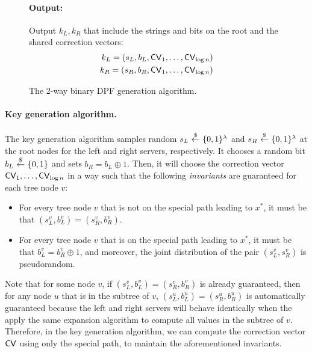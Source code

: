 \begin{figure}[p]
\begin{minipage}{\textwidth}
\begin{mdframed}
            \paragraph{Output:} Output $k_L, k_R$ that include the strings and bits on the root and the shared correction vectors:
            \begin{align*}
                k_L=(s_L, b_L, {\sf CV}_1,\dots,{\sf CV}_{\log n}) \\
                k_R=(s_R, b_R, {\sf CV}_1,\dots,{\sf CV}_{\log n})
            \end{align*}
            
        \end{mdframed}
    \end{minipage}
    \caption{The 2-way binary DPF generation algorithm.\label{fig:DPF}}
\label{fig:gen}
\end{figure}


\paragraph{Key generation algorithm.}
The key generation algorithm samples  
random $s_L ~{\overset{\$}{\leftarrow}}~ \{0, 1\}^\lambda$ and $s_R ~{\overset{\$}{\leftarrow}}~ \{0, 1\}^\lambda$ 
at the root nodes for the left and right servers, respectively.
It chooses a random bit $b_L ~{\overset{\$}{\leftarrow}}~\{0, 1\}$ 
and sets $b_R = b_L \oplus 1$.
Then, it will choose the correction vector ${\sf CV}_1, \ldots, {\sf CV}_{\log n}$
in a way such that 
the following {\it invariants} are guaranteed for each
tree node $v$:

\begin{itemize}[leftmargin=7mm]
\item 
For every tree node $v$
that is not on the special path leading to $x^*$, 
it must be that $(s_L^v, b_L^v) = (s_R^v, b_R^v)$.
\item 
For every tree node $v$
that is on the special path leading to $x^*$, 
it must be that $b_L^v = b_R^v \oplus 1$,
and moreover, the joint distribution of the pair $(s_L^v, s_R^v)$ 
is pseudorandom.
\end{itemize}

Note that for some node $v$, if 
$(s_L^v, b_L^v) = (s_R^v, b_R^v)$
is already guaranteed, then 
for any node $u$ that is in the 
subtree of $v$,  
$(s_L^u, b_L^u) = (s_R^u, b_R^u)$
is automatically guaranteed because
the left and right servers
will behave identically when the apply the same 
expansion algorithm to compute 
all values in the subtree of $v$.
Therefore, in the key generation algorithm, 
we can compute the correction vector ${\sf CV}$
using only the special path, to maintain
the aforementioned invariants. 

